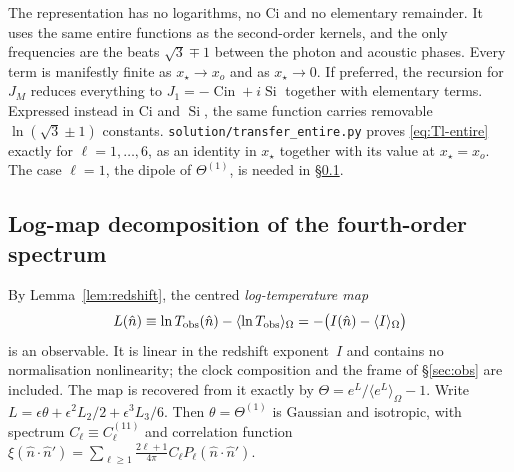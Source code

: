 \documentclass[11pt]{article}
\theoremstyle{definition}
\theoremstyle{remark}
\newcommand{\eps}{\epsilon}
\newcommand{\nh}{\hat n}
\newcommand{\sky}[1]{\langle #1\rangle_{\Omega}}
\newcommand{\Cin}{\operatorname{Cin}}
\newcommand{\Si}{\operatorname{Si}}
\newcommand{\code}[1]{\texttt{#1}}
\begin{document}
The representation has no logarithms, no $\mathrm{Ci}$ and no elementary remainder. It uses
the same entire functions as the second-order kernels, and the only frequencies are the beats
$\sqrt3\mp1$ between the photon and acoustic phases. Every term is manifestly finite as
$x_\star\to x_o$ and as $x_\star\to0$. If preferred, the recursion for $J_M$ reduces everything
to $J_1=-\Cin+i\Si$ together with elementary terms. Expressed instead in $\mathrm{Ci}$ and $\Si$,
the same function carries removable $\ln(\sqrt3\pm1)$ constants.
\code{solution/transfer\_entire.py} proves \eqref{eq:Tl-entire} exactly for
$\ell=1,\dots,6$, as an identity in $x_\star$ together with its value at $x_\star=x_o$. The
case $\ell=1$, the dipole of $\Theta^{(1)}$, is needed in \S\ref{sec:logmap}.

\subsection{Log-map decomposition of the fourth-order spectrum}\label{sec:logmap}
By Lemma~\ref{lem:redshift}, the centred \emph{log-temperature map}
\begin{equation}\label{eq:logmap}
L(\nh)\equiv\ln T_{\rm obs}(\nh)-\sky{\ln T_{\rm obs}}=-\big(I(\nh)-\sky{I}\big)
\end{equation}
is an observable. It is linear in the redshift exponent~$I$ and contains no normalisation
nonlinearity; the clock composition and the frame of \S\ref{sec:obs} are included. The map
is recovered from it exactly by $\Theta=e^L/\sky{e^L}-1$. Write
$L=\eps\theta+\eps^2L_2/2+\eps^3L_3/6$. Then $\theta=\Theta^{(1)}$ is Gaussian and isotropic,
with spectrum $C_\ell\equiv C_\ell^{(11)}$ and correlation function
$\xi(\nh\cdot\nh')=\sum_{\ell\ge1}\frac{2\ell+1}{4\pi}C_\ell P_\ell(\nh\cdot\nh')$.
\end{document}
